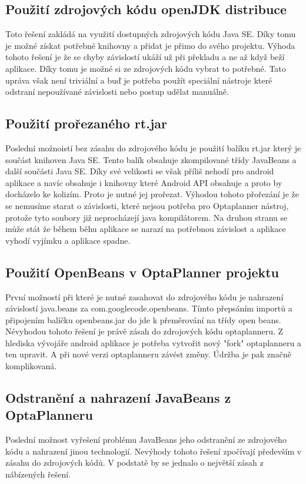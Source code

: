 \subsection{Použití zdrojových kódu openJDK distribuce}
Toto řešení zakládá na využití dostupných zdrojových kódu Java SE. Díky tomu je možné získat potřebné knihovny a přidat je přimo do svého projektu. Výhoda tohoto řešení je že se chyby závislostí ukáží už při překladu a ne až když beží aplikace. Díky tomu je možné si ze zdrojových kódu vybrat to potřebné. Tato upráva však není triviální a buď je potřeba použít speciální nástroje které odstraní nepoužívané závislosti nebo postup udělat manuálně. 

\subsection{Použití prořezaného rt.jar}
Poslední možnoistí bez zásahu do zdrojového kódu je použití balíku rt.jar který je součást knihoven Java SE. Tento balík obsahuje zkompilované třídy JavaBeans a další součásti Java SE. Díky své velikosti se však příliš nehodí pro android aplikace a navíc obsahuje i knihovny které Android API obsahuje a proto by docházelo ke kolizím. Proto je nutné jej prořezat. Výhodou tohoto přořezání je že se nemusíme starat o závislosti, které nejsou potřeba pro Optaplanner nástroj, protože tyto soubory již neprocházejí java kompilátorem. Na druhou stranu se může stát že během běhu aplikace se narazí na potřebnou závislost a aplikace vyhodí vyjímku a aplikace spadne.

\subsection{Použití OpenBeans v OptaPlanner projektu}
První možností při které je nutné zasahovat do zdrojového kódu je nahrazení závislostí java.beans za com.googlecode.openbeans. Tímto přepsáním importů a připojením balíčku openbeans.jar do jde k přeměrování na třídy open beans. Névyhodou tohoto řešení je právě zásah do zdrojových kódu optaplanneru. Z hlediska vývojáře android aplikace je potřeba vytvořit nový "fork" optaplanneru a ten upravit. A při nové verzi optaplanneru závést změny. Údržba je pak značně komplikovaná.

\subsection{Odstranění a nahrazení JavaBeans z OptaPlanneru}
Poslední možnost vyřešení problému JavaBeans jeho odstranění ze zdrojového kódu a nahrazení jinou technologií. Nevýhody tohoto řešení zpočívají především v zásahu do zdrojových kódů. V podstatě by se jednalo o největší zásah z nábízených řešení. 

